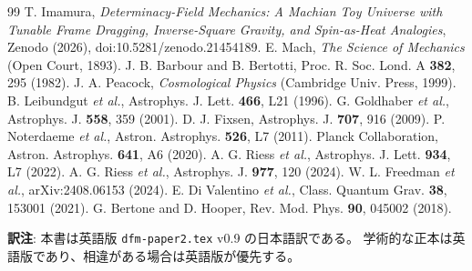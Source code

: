 \documentclass[a4paper,10pt,twocolumn]{ltjsarticle}
\begin{document}
\begin{thebibliography}{99}
 T. Imamura, \emph{Determinacy-Field Mechanics: A Machian Toy
Universe with Tunable Frame Dragging, Inverse-Square Gravity, and
Spin-as-Heat Analogies}, Zenodo (2026), doi:10.5281/zenodo.21454189.
 E. Mach, \emph{The Science of Mechanics} (Open Court, 1893).
 J. B. Barbour and B. Bertotti, Proc. R. Soc. Lond. A \textbf{382}, 295 (1982).
 J. A. Peacock, \emph{Cosmological Physics} (Cambridge Univ. Press, 1999).
 B. Leibundgut \emph{et al.}, Astrophys. J. Lett. \textbf{466}, L21 (1996).
 G. Goldhaber \emph{et al.}, Astrophys. J. \textbf{558}, 359 (2001).
 D. J. Fixsen, Astrophys. J. \textbf{707}, 916 (2009).
 P. Noterdaeme \emph{et al.}, Astron. Astrophys. \textbf{526}, L7 (2011).
 Planck Collaboration, Astron. Astrophys. \textbf{641}, A6 (2020).
 A. G. Riess \emph{et al.}, Astrophys. J. Lett. \textbf{934}, L7 (2022).
 A. G. Riess \emph{et al.}, Astrophys. J. \textbf{977}, 120 (2024).
 W. L. Freedman \emph{et al.}, arXiv:2408.06153 (2024).
 E. Di Valentino \emph{et al.}, Class. Quantum Grav. \textbf{38}, 153001 (2021).
 G. Bertone and D. Hooper, Rev. Mod. Phys. \textbf{90}, 045002 (2018).
\end{thebibliography}

\vspace{1em}
\noindent\textbf{訳注}: 本書は英語版 \texttt{dfm-paper2.tex} v0.9 の日本語訳である。
学術的な正本は英語版であり、相違がある場合は英語版が優先する。
\end{document}

